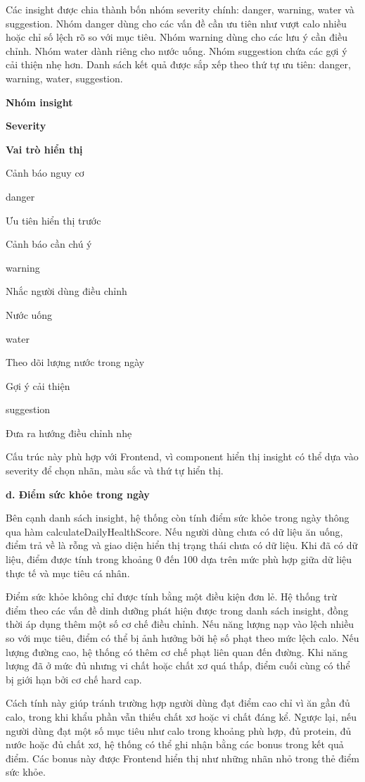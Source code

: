 \documentclass[12pt, a4paper]{report}
\begin{document}
Các insight được chia thành bốn nhóm severity chính: danger, warning, water và suggestion. Nhóm danger dùng cho các vấn đề cần ưu tiên như vượt calo nhiều hoặc chỉ số lệch rõ so với mục tiêu. Nhóm warning dùng cho các lưu ý cần điều chỉnh. Nhóm water dành riêng cho nước uống. Nhóm suggestion chứa các gợi ý cải thiện nhẹ hơn. Danh sách kết quả được sắp xếp theo thứ tự ưu tiên: danger, warning, water, suggestion.

\textbf{Nhóm insight}

\textbf{Severity}

\textbf{Vai trò hiển thị}

Cảnh báo nguy cơ

danger

Ưu tiên hiển thị trước

Cảnh báo cần chú ý

warning

Nhắc người dùng điều chỉnh

Nước uống

water

Theo dõi lượng nước trong ngày

Gợi ý cải thiện

suggestion

Đưa ra hướng điều chỉnh nhẹ

Cấu trúc này phù hợp với Frontend, vì component hiển thị insight có thể dựa vào severity để chọn nhãn, màu sắc và thứ tự hiển thị.

\textbf{d. Điểm sức khỏe trong ngày}

Bên cạnh danh sách insight, hệ thống còn tính điểm sức khỏe trong ngày thông qua hàm calculateDailyHealthScore. Nếu người dùng chưa có dữ liệu ăn uống, điểm trả về là rỗng và giao diện hiển thị trạng thái chưa có dữ liệu. Khi đã có dữ liệu, điểm được tính trong khoảng 0 đến 100 dựa trên mức phù hợp giữa dữ liệu thực tế và mục tiêu cá nhân.

Điểm sức khỏe không chỉ được tính bằng một điều kiện đơn lẻ. Hệ thống trừ điểm theo các vấn đề dinh dưỡng phát hiện được trong danh sách insight, đồng thời áp dụng thêm một số cơ chế điều chỉnh. Nếu năng lượng nạp vào lệch nhiều so với mục tiêu, điểm có thể bị ảnh hưởng bởi hệ số phạt theo mức lệch calo. Nếu lượng đường cao, hệ thống có thêm cơ chế phạt liên quan đến đường. Khi năng lượng đã ở mức đủ nhưng vi chất hoặc chất xơ quá thấp, điểm cuối cùng có thể bị giới hạn bởi cơ chế hard cap.

Cách tính này giúp tránh trường hợp người dùng đạt điểm cao chỉ vì ăn gần đủ calo, trong khi khẩu phần vẫn thiếu chất xơ hoặc vi chất đáng kể. Ngược lại, nếu người dùng đạt một số mục tiêu như calo trong khoảng phù hợp, đủ protein, đủ nước hoặc đủ chất xơ, hệ thống có thể ghi nhận bằng các bonus trong kết quả điểm. Các bonus này được Frontend hiển thị như những nhãn nhỏ trong thẻ điểm sức khỏe.
\end{document}
